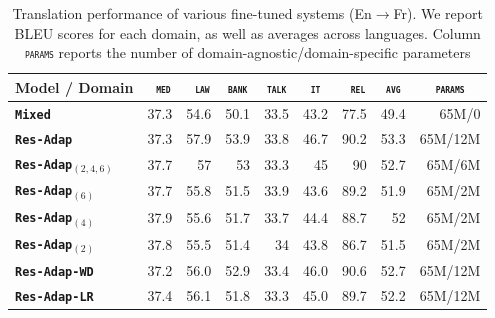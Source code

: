 \documentclass[11pt,a4paper]{article}
\newcommand{\fyDone}[1]{\done[FY]\Todo[FY:]{\textcolor{orange}{#1}}}
\newcommand{\domain}[1]{\texttt{\textsc{#1}}}
\newcommand{\system}[1]{\texttt{\textbf{#1}}}
\begin{document}
\begin{table}[htbp]
  \centering
  \begin{tabular}{|p{3cm}|*{8}{r|}} \hline
    Model / Domain & \multicolumn{1}{c|}{\domain{ med}} & \multicolumn{1}{c|}{\domain{ law}} & \multicolumn{1}{c|}{\domain{bank}} & \multicolumn{1}{c|}{\domain{talk}} & \multicolumn{1}{c|}{\domain{ it }} & \multicolumn{1}{c|}{\domain{ rel}} & \multicolumn{1}{c|}{\domain{avg}} & \multicolumn{1}{c|}{\domain{params}} \\ \hline 
    \system{Mixed}  & 37.3 & 54.6 & 50.1 & 33.5 & 43.2 & 77.5  & 49.4 & 65M/0 \\
    \system{Res-Adap}     & 37.3 & 57.9 & 53.9 & 33.8 & 46.7 & 90.2 & 53.3 & 65M/12M\\ \hline
    \system{Res-Adap$_{(2,4,6)}$}     & 37.7 & 57 & 53 & 33.3 & 45 & 90 & 52.7 & 65M/6M\\
    \system{Res-Adap$_{(6)}$}     & 37.7 & 55.8 & 51.5 & 33.9 & 43.6 & 89.2 & 51.9 & 65M/2M \\
    \system{Res-Adap$_{(4)}$}     & 37.9 & 55.6 & 51.7 & 33.7 & 44.4 & 88.7 & 52 & 65M/2M\\
    \system{Res-Adap$_{(2)}$}     & 37.8 & 55.5 & 51.4 & 34 & 43.8 & 86.7 & 51.5 & 65M/2M\\ \hline
    \system{Res-Adap-WD}     & 37.2 & 56.0 & 52.9 & 33.4 & 46.0 & 90.6 & 52.7 & 65M/12M \\
    \system{Res-Adap-LR}      & 37.4 & 56.1 & 51.8 & 33.3 & 45.0 & 89.7 & 52.2 & 65M/12M \\  
     \hline
  \end{tabular}
  \caption{Translation performance of various fine-tuned systems (En$\rightarrow$Fr). We report BLEU scores for each domain, as well as averages across languages. Column \domain{params} reports the number of domain-agnostic/domain-specific parameters \label{tab:performance-en-fr-pos-reg}} \fyDone{Boldface ?}
\end{table}
\end{document}
